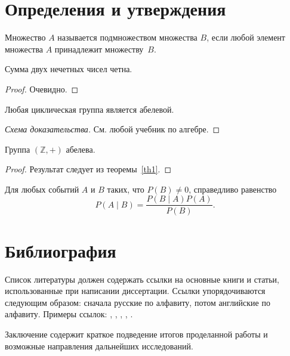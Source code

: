 \documentclass{stud-conf-pmk}
\begin{document}
\begin{paper}
\section{Определения и утверждения}

\begin{definition}
Множество $A$ называется подмножеством множества $B$, если любой элемент
множества $A$ принадлежит множеству~$B$.
\end{definition}

\begin{lemma}
Сумма двух нечетных чисел четна.
\end{lemma}
\begin{proof}
Очевидно.
\end{proof}

\begin{theorem}
\label{th1}
Любая циклическая группа является абелевой.
\end{theorem}
\begin{proof}[Схема доказательства]
См. любой учебник по алгебре.
\end{proof}

\begin{corollary}
Группа $(\mathbb Z,+)$ абелева.
\end{corollary}
\begin{proof}
Результат следует из теоремы~\ref{th1}.
\end{proof}

\begin{theorem}
Для любых событий $A$ и $B$ таких, что $P(B) \neq 0$, справедливо равенство
$$P(A \mid B)=\frac{P(B \mid A)P(A)}{P(B)}.$$
\end{theorem}


\section{Библиография}

Список литературы должен содержать ссылки на основные книги и статьи,
использованные при написании диссертации. Ссылки упорядочиваются следующим
образом: сначала русские по алфавиту, потом английские по алфавиту.
Примеры ссылок: \cite{bib1}, \cite{bib2,bib4}, \cite{bib3,bib4,bib5},
\cite{bib6,bib7,bib8,bib9,bib11,bib12}, \cite[с.\,125]{bib10}.

\conclusion

Заключение содержит краткое подведение итогов проделанной работы
и возможные направления дальнейших исследований.


\end{paper}
\end{document}
